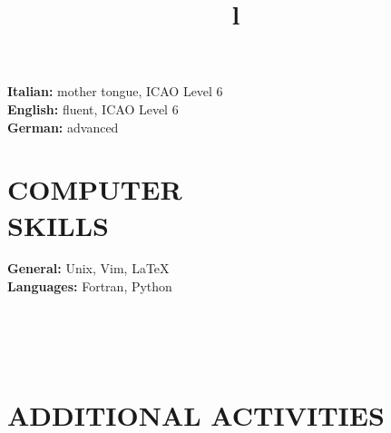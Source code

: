 \documentclass[margin]{res}
\begin{document}
\begin{resume}
\textbf{Italian: } mother tongue, ICAO Level 6
\\
\textbf{English: } fluent, ICAO Level 6
\\
\textbf{German: } advanced

\section{COMPUTER\\SKILLS}

\textbf{General: } Unix, Vim, \LaTeX
\\
\textbf{Languages: } Fortran, Python

\begin{format}
\title{l}\\
\\
\body\\
\end{format}

\section{ADDITIONAL ACTIVITIES}




\end{resume}
\(\)
\end{document}
